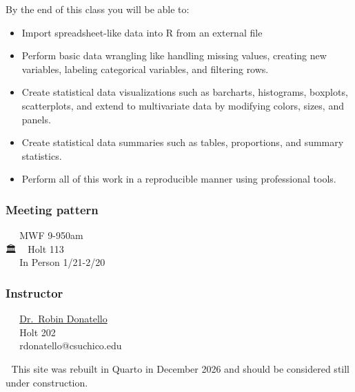 \documentclass[
  letterpaper,
  DIV=11,
  numbers=noendperiod,
  oneside]{scrreprt}
\providecommand{\tightlist}{%
  \setlength{\itemsep}{0pt}\setlength{\parskip}{0pt}}\usepackage{longtable,booktabs,array}
\begin{document}
\begin{tcolorbox}[enhanced jigsaw, bottomrule=.15mm, colback=white, colframe=quarto-callout-note-color-frame, toprule=.15mm, coltitle=black, rightrule=.15mm, opacitybacktitle=0.6, colbacktitle=quarto-callout-note-color!10!white, toptitle=1mm, leftrule=.75mm, breakable, bottomtitle=1mm, titlerule=0mm, title=\textcolor{quarto-callout-note-color}{\faInfo}\hspace{0.5em}{Course Learning Objectives}, arc=.35mm, left=2mm, opacityback=0]

By the end of this class you will be able to:

\begin{itemize}
\tightlist
\item
  Import spreadsheet-like data into R from an external file
\item
  Perform basic data wrangling like handling missing values, creating
  new variables, labeling categorical variables, and filtering rows.
\item
  Create statistical data visualizations such as barcharts, histograms,
  boxplots, scatterplots, and extend to multivariate data by modifying
  colors, sizes, and panels.
\item
  Create statistical data summaries such as tables, proportions, and
  summary statistics.
\item
  Perform all of this work in a reproducible manner using professional
  tools.
\end{itemize}

\end{tcolorbox}

\begin{tcolorbox}[enhanced jigsaw, bottomrule=.15mm, colback=white, colframe=quarto-callout-tip-color-frame, toprule=.15mm, coltitle=black, rightrule=.15mm, opacitybacktitle=0.6, colbacktitle=quarto-callout-tip-color!10!white, toptitle=1mm, leftrule=.75mm, breakable, bottomtitle=1mm, titlerule=0mm, title={Details for Spring 2026}, arc=.35mm, left=2mm, opacityback=0]

\subsubsection*{Meeting pattern}\label{meeting-pattern}

📅 ~ MWF 9-950am\\
🏛 ~ Holt 113\\
👥️ ~ In Person 1/21-2/20

\subsubsection*{Instructor}\label{instructor}

🐾 ~ \href{https://www.norcalbiostat.com}{Dr.~Robin Donatello}\\
🚪 ~ Holt 202\\
📧 ~ rdonatello@csuchico.edu

🚧 This site was rebuilt in Quarto in December 2026 and should be
considered still under construction.

\end{tcolorbox}
\end{document}
